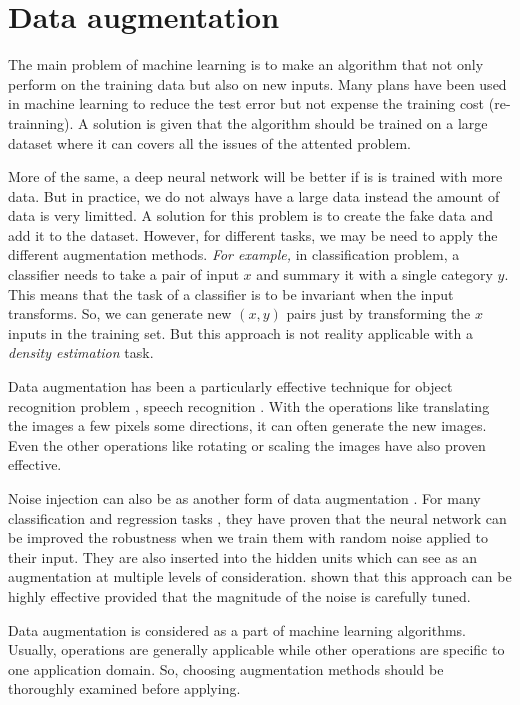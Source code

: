 \section{Data augmentation}

The main problem of machine learning is to make an algorithm that not only perform on the training data but also on new inputs. Many plans have been used in machine learning to reduce the test error but not expense the training cost (re-trainning). A solution is given that the algorithm should be trained on a large dataset where it can covers all the issues of the attented problem.

More of the same, a deep neural network will be better if is is trained with more data. But in practice, we do not always have a large data instead the amount of data is very limitted. A solution for this problem is to create the fake data and add it to the dataset. However, for different tasks, we may be need to apply the different augmentation methods. \textit{For example,} in classification problem, a classifier needs to take a pair of input $x$ and summary it with a single category $y$. This means that the task of a classifier is to be invariant when the input transforms. So, we can generate new $(x,y)$ pairs just by transforming the $x$ inputs in the training set. But this approach is not reality applicable with a \textit{density estimation} task.

Data augmentation has been a particularly effective technique for object recognition problem \cite{}, speech recognition \cite{}. With the operations like translating the images a few pixels some directions, it can often generate the new images. Even the other operations like rotating or scaling the images have also proven effective.

Noise injection can also be as another form of data augmentation \cite{}. For many classification and regression tasks \cite{}, they have proven that the neural network can be improved the robustness when we train them with random noise applied to their input. They are also inserted into the hidden units which can see as an augmentation at multiple levels of consideration. \cite{} shown that this approach can be highly effective provided that the magnitude of the noise is carefully tuned.

Data augmentation is considered as a part of machine learning algorithms. Usually, operations are generally applicable while other operations are specific to one application domain. So, choosing augmentation methods should be thoroughly examined before applying.

